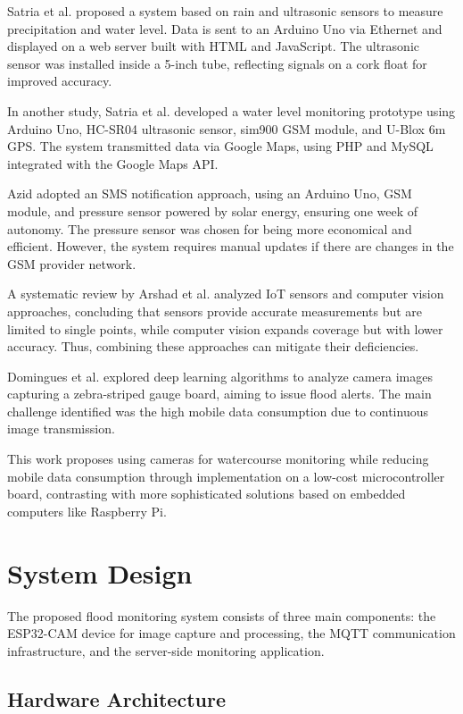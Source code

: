 \documentclass[conference]{IEEEtran}
\begin{document}
Satria et al. \cite{satria2018design} proposed a system based on rain and ultrasonic sensors to measure precipitation and water level. Data is sent to an Arduino Uno via Ethernet and displayed on a web server built with HTML and JavaScript. The ultrasonic sensor was installed inside a 5-inch tube, reflecting signals on a cork float for improved accuracy.

In another study, Satria et al. \cite{satria2017prototype} developed a water level monitoring prototype using Arduino Uno, HC-SR04 ultrasonic sensor, sim900 GSM module, and U-Blox 6m GPS. The system transmitted data via Google Maps, using PHP and MySQL integrated with the Google Maps API.

Azid \cite{azid2015sms} adopted an SMS notification approach, using an Arduino Uno, GSM module, and pressure sensor powered by solar energy, ensuring one week of autonomy. The pressure sensor was chosen for being more economical and efficient. However, the system requires manual updates if there are changes in the GSM provider network.

A systematic review by Arshad et al. \cite{arshad2019computer} analyzed IoT sensors and computer vision approaches, concluding that sensors provide accurate measurements but are limited to single points, while computer vision expands coverage but with lower accuracy. Thus, combining these approaches can mitigate their deficiencies.

Domingues et al. \cite{domingues2024deep} explored deep learning algorithms to analyze camera images capturing a zebra-striped gauge board, aiming to issue flood alerts. The main challenge identified was the high mobile data consumption due to continuous image transmission.

This work proposes using cameras for watercourse monitoring while reducing mobile data consumption through implementation on a low-cost microcontroller board, contrasting with more sophisticated solutions based on embedded computers like Raspberry Pi.

\section{System Design}

The proposed flood monitoring system consists of three main components: the ESP32-CAM device for image capture and processing, the MQTT communication infrastructure, and the server-side monitoring application.

\subsection{Hardware Architecture}
\end{document}
